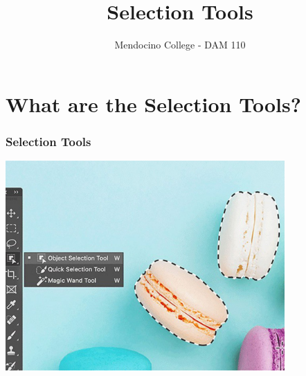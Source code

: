 \documentclass{beamer}
\title{Selection Tools}
\author{Mendocino College - DAM 110}
\date{\vspace{-5em}}
\begin{document}
	{
		\begin{frame}
			\vspace{-35pt}
			\maketitle
		\end{frame}
	}



	\section{What are the Selection Tools?}
		\begin{frame}
		\frametitle{Selection Tools}
		\begin{center}
			\includegraphics[width = 0.8\textwidth]{images/Photoshop_10_56.jpg}
		\end{center}
	\end{frame}
	
\end{document}
